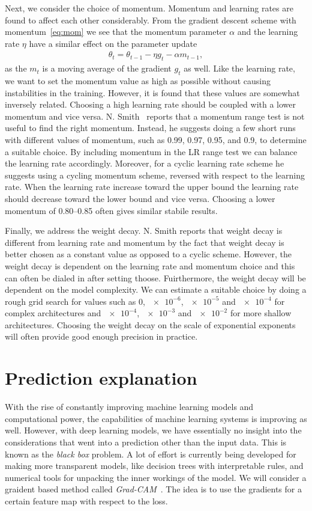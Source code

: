 Next, we consider the choice of momentum. Momentum and learning rates are found to affect each other considerably. From the gradient descent scheme with momentum~\cref{eq:mom} we see that the momentum parameter $\alpha$ and the learning rate $\eta$ have a similar effect on the parameter update
\begin{align*}
  \theta_t = \theta_{t-1} - \eta g_t - \alpha m_{t-1},
\end{align*}
as the $m_t$ is a moving average of the gradient $g_t$ as well. Like the
learning rate, we want to set the momentum value as high as possible without
causing instabilities in the training. However, it is found that these values
are somewhat inversely related. Choosing a high learning rate should be coupled
with a lower momentum and vice versa. N. Smith~\cite{smith2018disciplined}
reports that a momentum range test is not useful to find the right momentum.
Instead, he suggests doing a few short runs with different values of momentum,
such as 0.99, 0.97, 0.95, and 0.9, to determine a suitable choice. By including
momentum in the LR range test we can balance the learning rate accordingly.
Moreover, for a cyclic learning rate scheme he suggests using a cycling momentum
scheme, reversed with respect to the learning rate. When the
learning rate increase toward the upper bound the learning rate should
decrease toward the lower bound and vice versa. Choosing a lower momentum of
0.80--0.85 often gives similar stabile results.


Finally, we address the weight decay. N. Smith reports that weight decay is different from learning rate and momentum by the fact that weight decay is better chosen as a constant value as opposed to a cyclic scheme. However, the weight decay is dependent on the learning rate and momentum choice and this can often be dialed in after setting thoose. Fuirthermore, the weight decay will be dependent on the model complexity. We can estimate a suitable choice by doing a rough grid search for values such as 0, $\num{e-6}$, $\num{e-5}$ and $\num{e-4}$ for complex architectures and $\num{e-4}$, $\num{e-3}$ and $\num{e-2}$ for more shallow architectures. Choosing the weight decay on the scale of exponential exponents will often provide good enough precision in practice. 



\section{Prediction explanation}\label{sec:explanation}
With the rise of constantly improving machine learning models and computational
power, the capabilities of machine learning systems is improving as well. However, with deep learning models, we have essentially no insight into the considerations that went into a prediction other than the input data. This is known as the \textit{black box} problem. A lot of effort is currently being developed for making more transparent models, like decision trees with interpretable rules, and numerical tools for unpacking the inner workings of the model. We will consider a graident based method called  \textit{Grad-CAM}~\cite{Selvaraju_2019}. The idea is to use the gradients for a certain feature map with respect to the loss. 

